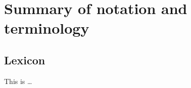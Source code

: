 \section{Summary of notation and terminology}  \label{sec:notation}

\subsection{Lexicon} \label{subsec:lexicon}

\begin{description}
  \I[hyperparameter]
   This is \ldots
\end{description}